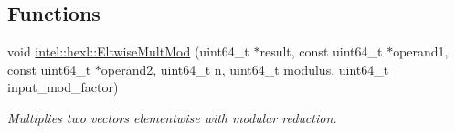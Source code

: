 \subsection*{Functions}
\begin{DoxyCompactItemize}
\item 
void \hyperlink{namespaceintel_1_1hexl_a705bc0321d937ae4d1f8d50279e3cff1}{intel\+::hexl\+::\+Eltwise\+Mult\+Mod} (uint64\+\_\+t $\ast$result, const uint64\+\_\+t $\ast$operand1, const uint64\+\_\+t $\ast$operand2, uint64\+\_\+t n, uint64\+\_\+t modulus, uint64\+\_\+t input\+\_\+mod\+\_\+factor)
\begin{DoxyCompactList}\small\item\em Multiplies two vectors elementwise with modular reduction. \end{DoxyCompactList}\end{DoxyCompactItemize}
